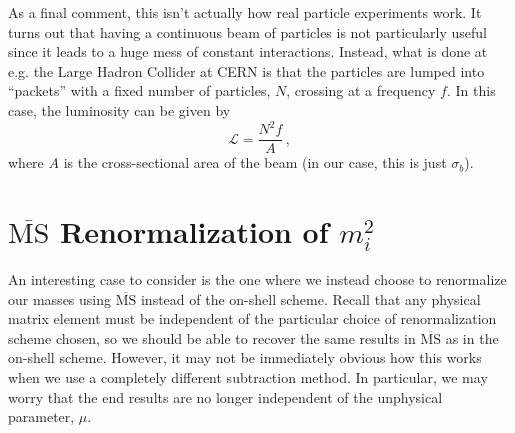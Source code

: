 \documentclass{article}
\numberwithin{equation}{subsection}
\begin{document}
As a final comment, this isn't actually how real particle experiments work. It turns out that having a continuous beam of particles is not particularly useful
since it leads to a huge mess of constant interactions. Instead, what is done at e.g. the Large Hadron Collider at CERN is that the particles are lumped into
``packets'' with a fixed number of particles, $N$, crossing at a frequency $f$. In this case, the luminosity can be given by
\begin{equation}
	\mathcal{L} = \frac{N^2 f}{A}\,,
\end{equation}
where $A$ is the cross-sectional area of the beam (in our case, this is just $\sigma_b$).

\appendix

\section{$\overline{\text{MS}}$ Renormalization of $m_i^2$}

An interesting case to consider is the one where we instead choose to renormalize our masses using $\overline{\text{MS}}$ instead of the on-shell scheme. 
Recall that any physical matrix element must be independent of the particular choice of renormalization scheme chosen, so we should be able to recover the same results in 
$\overline{\text{MS}}$ as in the on-shell scheme. However, it may not be immediately obvious how this works when we use a completely different subtraction method. In particular, we may worry 
that the end results are no longer independent of the unphysical parameter, $\mu$.
\end{document}
